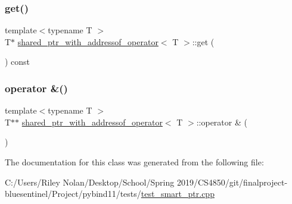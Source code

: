 \subsubsection{\texorpdfstring{get()}{get()}}
{\footnotesize\ttfamily template$<$typename T $>$ \\
T$\ast$ \mbox{\hyperlink{classshared__ptr__with__addressof__operator}{shared\+\_\+ptr\+\_\+with\+\_\+addressof\+\_\+operator}}$<$ T $>$\+::get (\begin{DoxyParamCaption}{ }\end{DoxyParamCaption}) const\hspace{0.3cm}{\ttfamily [inline]}}

\mbox{\label{classshared__ptr__with__addressof__operator_aa3b91ada8c525714cf935d261dd44712}} 
\subsubsection{\texorpdfstring{operator \&()}{operator \&()}}
{\footnotesize\ttfamily template$<$typename T $>$ \\
T$\ast$$\ast$ \mbox{\hyperlink{classshared__ptr__with__addressof__operator}{shared\+\_\+ptr\+\_\+with\+\_\+addressof\+\_\+operator}}$<$ T $>$\+::operator \& (\begin{DoxyParamCaption}{ }\end{DoxyParamCaption})\hspace{0.3cm}{\ttfamily [inline]}}



The documentation for this class was generated from the following file\+:\begin{DoxyCompactItemize}
\item 
C\+:/\+Users/\+Riley Nolan/\+Desktop/\+School/\+Spring 2019/\+C\+S4850/git/finalproject-\/bluesentinel/\+Project/pybind11/tests/\mbox{\hyperlink{test__smart__ptr_8cpp}{test\+\_\+smart\+\_\+ptr.\+cpp}}\end{DoxyCompactItemize}
